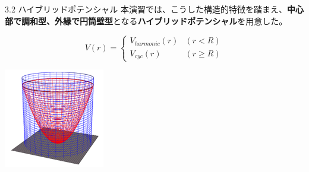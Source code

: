 \documentclass{beamer}
\begin{document}
\begin{frame}{3.2 ハイブリッドポテンシャル}
  本演習では、こうした構造的特徴を踏まえ、\textbf{中心部で調和型、外縁で円筒壁型}となる\textbf{ハイブリッドポテンシャル}を用意した。
  
  \vspace{0.5em}
  \begin{minipage}{0.7\textwidth}
  \begin{equation}
  V(r) =
  \begin{cases}
  V_{harmonic}(r) & (r < R) \\
  V_{cyc}(r) & (r \geq R)
  \end{cases}
  \end{equation}
  \end{minipage}
  \hfill
  \begin{minipage}{0.25\textwidth}
  \includegraphics[width=0.5\linewidth]{images/ハイブリッド.png} \\
  \end{minipage}
  
  \end{frame}
\end{document}
